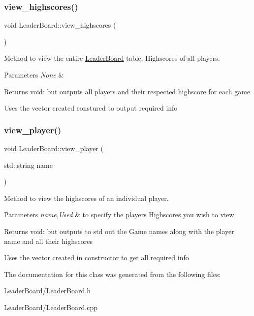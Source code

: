 \subsubsection{\texorpdfstring{view\+\_\+highscores()}{view\_highscores()}}
{\footnotesize\ttfamily void Leader\+Board\+::view\+\_\+highscores (\begin{DoxyParamCaption}{ }\end{DoxyParamCaption})}



Method to view the entire \hyperlink{classLeaderBoard}{Leader\+Board} table, Highscores of all players. 


\begin{DoxyParams}{Parameters}
{\em None} & \\
\hline
\end{DoxyParams}
\begin{DoxyReturn}{Returns}
void\+: but outputs all players and their respected highscore for each game
\end{DoxyReturn}
Uses the vector created constured to output required info \mbox{\label{classLeaderBoard_ae5abb64b73518c25bc32809b5547a87c}} 
\subsubsection{\texorpdfstring{view\+\_\+player()}{view\_player()}}
{\footnotesize\ttfamily void Leader\+Board\+::view\+\_\+player (\begin{DoxyParamCaption}\item[{std\+::string}]{name }\end{DoxyParamCaption})}



Method to view the highscores of an individual player. 


\begin{DoxyParams}{Parameters}
{\em name,Used} & to specify the players Highscores you wish to view \\
\hline
\end{DoxyParams}
\begin{DoxyReturn}{Returns}
void\+: but outputs to std out the Game names along with the player name and all their highscores
\end{DoxyReturn}
Uses the vector created in constructor to get all required info 

The documentation for this class was generated from the following files\+:\begin{DoxyCompactItemize}
\item 
Leader\+Board/Leader\+Board.\+h\item 
Leader\+Board/Leader\+Board.\+cpp\end{DoxyCompactItemize}
